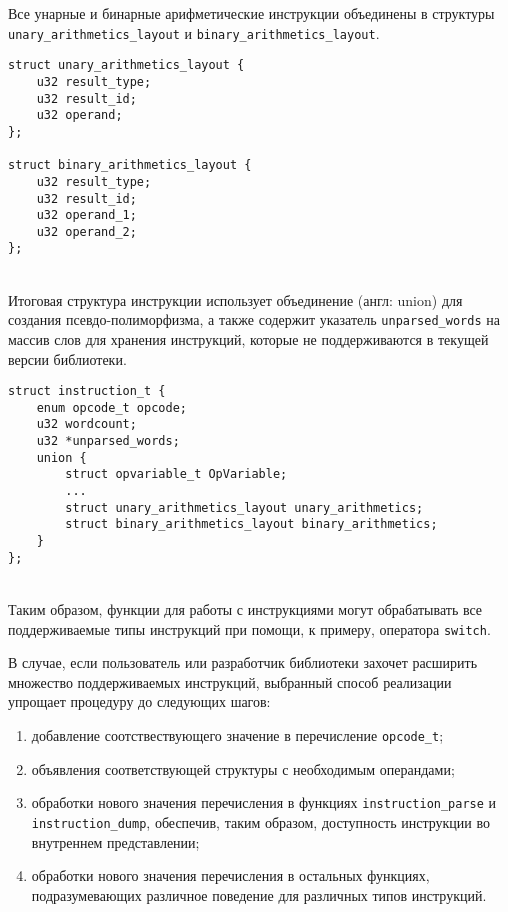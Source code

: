 \documentclass[14pt]{extarticle}
\begin{document}
Все унарные и бинарные арифметические инструкции объединены в структуры \texttt{unary\_arithmetics\_layout} и \texttt{binary\_arithmetics\_layout}.
\begin{lstlisting}[caption={структуры арифметических инструкций}]
struct unary_arithmetics_layout {
    u32 result_type;
    u32 result_id;
    u32 operand;
};

struct binary_arithmetics_layout {
    u32 result_type;
    u32 result_id;
    u32 operand_1;
    u32 operand_2;
};
\end{lstlisting}
~\\ %

Итоговая структура инструкции использует объединение (англ: union) для создания псевдо-полиморфизма, а также содержит указатель \texttt{unparsed\_words} на массив слов для хранения инструкций, которые не поддерживаются в текущей версии библиотеки.
\begin{lstlisting}[caption={обобщенная стуктура инструкции}]
struct instruction_t {
    enum opcode_t opcode;
    u32 wordcount;
    u32 *unparsed_words;
    union {
        struct opvariable_t OpVariable;
        ...
        struct unary_arithmetics_layout unary_arithmetics;
        struct binary_arithmetics_layout binary_arithmetics;
    }
};
\end{lstlisting}
~\\ %

Таким образом, функции для работы с инструкциями могут обрабатывать все поддерживаемые типы инструкций при помощи, к примеру, оператора \texttt{switch}.

В случае, если пользователь или разработчик библиотеки захочет расширить множество поддерживаемых инструкций, выбранный способ реализации упрощает процедуру до следующих шагов:
\begin{enumerate}
	\item добавление соотствествующего значение в перечисление \texttt{opcode\_t};
	
	\item объявления соответствующей структуры с необходимым операндами;
	
	\item обработки нового значения перечисления в функциях \texttt{instruction\_parse} и\\
	\texttt{instruction\_dump}, обеспечив, таким образом, доступность инструкции во внутреннем представлении;
	
	\item обработки нового значения перечисления в остальных функциях, подразумевающих различное поведение для различных типов инструкций.
\end{enumerate}
\end{document}
